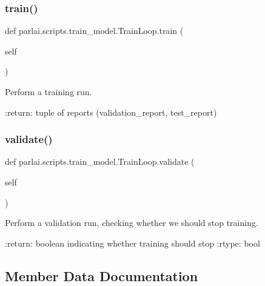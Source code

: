 \subsubsection{\texorpdfstring{train()}{train()}}
{\footnotesize\ttfamily def parlai.\+scripts.\+train\+\_\+model.\+Train\+Loop.\+train (\begin{DoxyParamCaption}\item[{}]{self }\end{DoxyParamCaption})}

\begin{DoxyVerb}Perform a training run.

:return: tuple of reports (validation_report, test_report)
\end{DoxyVerb}
 \mbox{\label{classparlai_1_1scripts_1_1train__model_1_1TrainLoop_a707bb03792ef7427f5ddbb66184a9756}} 
\subsubsection{\texorpdfstring{validate()}{validate()}}
{\footnotesize\ttfamily def parlai.\+scripts.\+train\+\_\+model.\+Train\+Loop.\+validate (\begin{DoxyParamCaption}\item[{}]{self }\end{DoxyParamCaption})}

\begin{DoxyVerb}Perform a validation run, checking whether we should stop training.

:return: boolean indicating whether training should stop
:rtype: bool
\end{DoxyVerb}
 

\subsection{Member Data Documentation}
\mbox{\label{classparlai_1_1scripts_1_1train__model_1_1TrainLoop_a04b7275f3ab548989a48161a7f1b8f3c}} 
